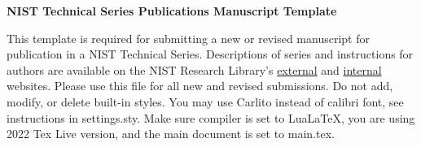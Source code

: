 \begin{titlepage}

\textbf{NIST Technical Series Publications Manuscript Template}

This template is required for submitting a new or revised manuscript for publication in a NIST Technical Series. Descriptions of series and instructions for authors are available 
on the NIST Research Library’s \href{https://www.nist.gov/nist-research-library/nist-publications}{external} and \href{https://inet.nist.gov/library/publishing-support-nist-publications/nist-technical-series-publications}{internal} websites.
Please use this file for all new and revised submissions. 
Do not add, modify, or delete built-in styles. You may use Carlito instead of calibri font, see instructions in settings.sty.
Make sure compiler is set to LuaLaTeX, you are using 2022 Tex Live version, and the main document is set to main.tex.


\end{titlepage}
